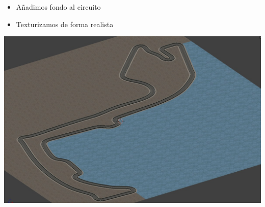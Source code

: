 \documentclass[notes,slidesec,a4]{seminar}
\begin{document}
\begin{hslide}
	\begin{minipage}{0.5\textwidth}
		\begin{itemize}
			\item Añadimos fondo al circuito
			\item Texturizamos de forma realista
		\end{itemize}
	\end{minipage}
	\begin{minipage}{0.5\textwidth}
		\includegraphics[width=\textwidth]{MonacoPlano1.jpg}
	\end{minipage}
\end{hslide}
\end{document}
